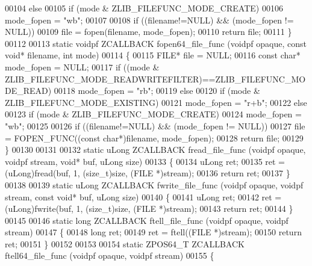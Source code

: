 \begin{DoxyCode}
00104     \textcolor{keywordflow}{else}
00105     \textcolor{keywordflow}{if} (mode & ZLIB\_FILEFUNC\_MODE\_CREATE)
00106         mode\_fopen = \textcolor{stringliteral}{"wb"};
00107 
00108     \textcolor{keywordflow}{if} ((filename!=NULL) && (mode\_fopen != NULL))
00109         file = fopen(filename, mode\_fopen);
00110     \textcolor{keywordflow}{return} file;
00111 \}
00112 
00113 \textcolor{keyword}{static} voidpf ZCALLBACK fopen64\_file\_func (voidpf opaque, \textcolor{keyword}{const} \textcolor{keywordtype}{void}* filename, \textcolor{keywordtype}{int} mode)
00114 \{
00115     FILE* file = NULL;
00116     \textcolor{keyword}{const} \textcolor{keywordtype}{char}* mode\_fopen = NULL;
00117     \textcolor{keywordflow}{if} ((mode & ZLIB\_FILEFUNC\_MODE\_READWRITEFILTER)==ZLIB\_FILEFUNC\_MODE\_READ)
00118         mode\_fopen = \textcolor{stringliteral}{"rb"};
00119     \textcolor{keywordflow}{else}
00120     \textcolor{keywordflow}{if} (mode & ZLIB\_FILEFUNC\_MODE\_EXISTING)
00121         mode\_fopen = \textcolor{stringliteral}{"r+b"};
00122     \textcolor{keywordflow}{else}
00123     \textcolor{keywordflow}{if} (mode & ZLIB\_FILEFUNC\_MODE\_CREATE)
00124         mode\_fopen = \textcolor{stringliteral}{"wb"};
00125 
00126     \textcolor{keywordflow}{if} ((filename!=NULL) && (mode\_fopen != NULL))
00127         file = FOPEN\_FUNC((\textcolor{keyword}{const} \textcolor{keywordtype}{char}*)filename, mode\_fopen);
00128     \textcolor{keywordflow}{return} file;
00129 \}
00130 
00131 
00132 \textcolor{keyword}{static} uLong ZCALLBACK fread\_file\_func (voidpf opaque, voidpf stream, \textcolor{keywordtype}{void}* buf, uLong size)
00133 \{
00134     uLong ret;
00135     ret = (uLong)fread(buf, 1, (\textcolor{keywordtype}{size\_t})size, (FILE *)stream);
00136     \textcolor{keywordflow}{return} ret;
00137 \}
00138 
00139 \textcolor{keyword}{static} uLong ZCALLBACK fwrite\_file\_func (voidpf opaque, voidpf stream, \textcolor{keyword}{const} \textcolor{keywordtype}{void}* buf, uLong size)
00140 \{
00141     uLong ret;
00142     ret = (uLong)fwrite(buf, 1, (\textcolor{keywordtype}{size\_t})size, (FILE *)stream);
00143     \textcolor{keywordflow}{return} ret;
00144 \}
00145 
00146 \textcolor{keyword}{static} \textcolor{keywordtype}{long} ZCALLBACK ftell\_file\_func (voidpf opaque, voidpf stream)
00147 \{
00148     \textcolor{keywordtype}{long} ret;
00149     ret = ftell((FILE *)stream);
00150     \textcolor{keywordflow}{return} ret;
00151 \}
00152 
00153 
00154 \textcolor{keyword}{static} ZPOS64\_T ZCALLBACK ftell64\_file\_func (voidpf opaque, voidpf stream)
00155 \{

\end{DoxyCode}
